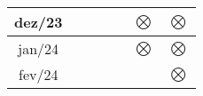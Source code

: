 \begin{table}
\begin{tabular}{|ccccccc|}
    \multicolumn{1}{|c|}{dez/23} & \multicolumn{1}{c|}{}  & \multicolumn{1}{c|}{}  & \multicolumn{1}{c|}{}  & \multicolumn{1}{c|}{}  & \multicolumn{1}{c|}{$\bigotimes$} & $\bigotimes$ \\ \hline
    \multicolumn{1}{|c|}{jan/24} & \multicolumn{1}{c|}{}  & \multicolumn{1}{c|}{}  & \multicolumn{1}{c|}{}  & \multicolumn{1}{c|}{}  & \multicolumn{1}{c|}{$\bigotimes$} & $\bigotimes$ \\ \hline
    \multicolumn{1}{|c|}{fev/24} & \multicolumn{1}{c|}{}  & \multicolumn{1}{c|}{}  & \multicolumn{1}{c|}{}  & \multicolumn{1}{c|}{}  & \multicolumn{1}{c|}{}  & $\bigotimes$ \\ \hline
\end{tabular}
\end{table}
